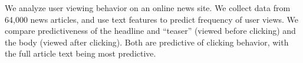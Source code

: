 We analyze user viewing behavior on an online news site. We collect data from 64,000 news articles, and use text features to predict frequency of user views. We compare predictiveness of the headline and ``teaser'' (viewed before clicking) and the body (viewed after clicking). Both are predictive of clicking behavior, with the full article text being most predictive.
